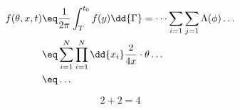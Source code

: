 \documentclass[class=../config/class, crop=false]{standalone}
\begin{document}
\pagestyle{fancy}
 
    \Blinddocument
    
    \blindmathpaper

    \begin{align}
        f(\theta,x,t) &\eq \frac{1}{2\pi}\int_{T}^{t_0}f(y) \dd{\Gamma} = \dots \sum_{i=1}\sum_{j=1}\Lambda (\phi)\dots \label{eq:teste}\\
        &\eq \sum_{i=1}^{N}\prod_{i=1}^{N} \dd{x_i} \frac{2}{4x} \cdot \theta \dots \nonumber \\
        &\eq \dots
    \end{align}
    
    \begin{equation}
        2 + 2 = 4
    \end{equation}
    
    \lipsum[1]  
    \lipsum[1]
\end{document}
